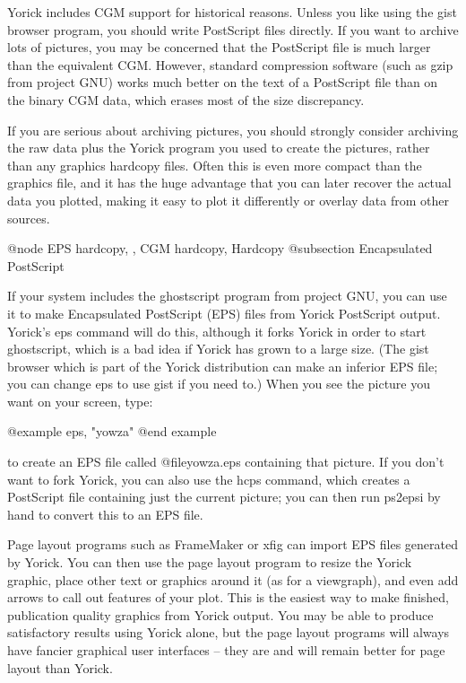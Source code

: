 Yorick includes CGM support for historical reasons.  Unless you like
using the gist browser program, you should write PostScript files
directly.  If you want to archive lots of pictures, you may be
concerned that the PostScript file is much larger than the equivalent
CGM.  However, standard compression software (such as gzip from
project GNU) works much better on the text of a PostScript file than
on the binary CGM data, which erases most of the size discrepancy.

If you are serious about archiving pictures, you should strongly
consider archiving the raw data plus the Yorick program you used to
create the pictures, rather than any graphics hardcopy files.  Often
this is even more compact than the graphics file, and it has the huge
advantage that you can later recover the actual data you plotted,
making it easy to plot it differently or overlay data from other
sources.

@node EPS hardcopy,  , CGM hardcopy, Hardcopy
@subsection Encapsulated PostScript

If your system includes the ghostscript program from project GNU, you
can use it to make Encapsulated PostScript (EPS) files from Yorick
PostScript output.  Yorick's eps command will do this, although it
forks Yorick in order to start ghostscript, which is a bad idea if
Yorick has grown to a large size.  (The gist browser which is part of
the Yorick distribution can make an inferior EPS file; you can change
eps to use gist if you need to.)  When you see the picture you want
on your screen, type:

@example
eps, "yowza"
@end example

to create an EPS file called @file{yowza.eps} containing that picture.
If you don't want to fork Yorick, you can also use the hcps command,
which creates a PostScript file containing just the current picture; you
can then run ps2epsi by hand to convert this to an EPS file.

Page layout programs such as FrameMaker or xfig can import EPS files
generated by Yorick.  You can then use the page layout program to
resize the Yorick graphic, place other text or graphics around it (as
for a viewgraph), and even add arrows to call out features of your
plot.  This is the easiest way to make finished, publication quality
graphics from Yorick output.  You may be able to produce satisfactory
results using Yorick alone, but the page layout programs will always
have fancier graphical user interfaces -- they are and will remain
better for page layout than Yorick.

